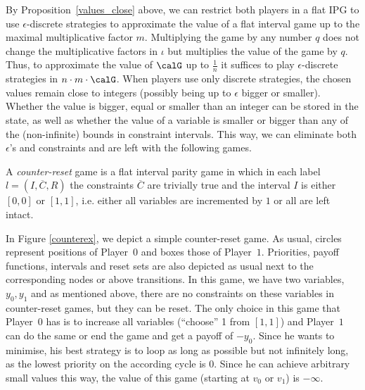 \documentclass[fleqn,envcountsame]{LMCS}
\newcommand{\ie}{i.e.\xspace}
\newcommand{\pzero}{Player~$0$\xspace}
\newcommand{\pone}{Player~$1$\xspace}
\newcommand{\ol}[1]{\ensuremath{\overline{#1}}}
\begin{document}
By Proposition~\ref{values_close} above, we can restrict both players
in a flat IPG to use $\epsilon$-discrete strategies to approximate the value
of a flat interval game up to the maximal multiplicative factor $m$.
Multiplying the game by any number $q$ does not change the
multiplicative factors in $\iota$ but multiplies the value
of the game by $q$. Thus, to approximate the value of $\calG$
up to $\frac 1 n$ it suffices to play $\epsilon$-discrete
strategies in $n \cdot m \cdot \calG$. When players use only
discrete strategies, the chosen values remain close to integers
(possibly being up to $\epsilon$ bigger or smaller).
Whether the value is bigger, equal or smaller than an integer
can be stored in the state, as well as whether the value of
a variable is smaller or bigger than any of the (non-infinite) bounds
in constraint intervals. This way, we can eliminate both $\epsilon$'s
and constraints and are left with the following games.

\begin{defi}
A \emph{counter-reset} game is a flat interval parity game in which
in each label $l = (I, \ol{C}, R)$ the constraints $\ol{C}$ are
trivially true and the interval $I$ is either $[0, 0]$ or $[1, 1]$,
\ie either all variables are incremented by $1$ or all are left intact.
\end{defi}

\begin{exa}
In Figure \ref{counterex}, we depict a simple counter-reset game.
As usual, circles represent positions of \pzero and boxes those of
\pone. Priorities, payoff functions, intervals and reset sets are
also depicted as usual next to the corresponding nodes or above
transitions.
In this game, we have two variables, $y_0, y_1$ and as mentioned
above, there are no constraints on these variables in counter-reset
games, but they can be reset. The only choice in this game that \pzero
has is to increase all variables (``choose'' 1 from $[1,1]$) 
and \pone can do the same
or end the game and get a payoff of $-y_0$. Since he wants to minimise, his
best strategy is to loop as long as possible but not infinitely long, as 
the lowest priority on the according cycle is 0. 
Since he can achieve arbitrary small values this way, the value of this game 
(starting at $v_0$ or $v_1$) is $-\infty$.
\end{exa}
\end{document}

